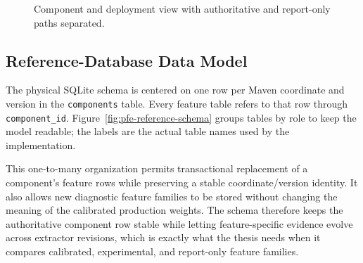 \begin{figure}[H]
{%
}
\caption{Component and deployment view with authoritative and report-only
paths separated.}
\label{fig:pfe-deployment}
\end{figure}

\subsection{Reference-Database Data Model}

The physical SQLite schema is centered on one row per Maven coordinate and
version in the \texttt{components} table. Every feature table refers to that
row through \texttt{component\_id}. Figure~\ref{fig:pfe-reference-schema}
groups tables by role to keep the model readable; the labels are the actual
table names used by the implementation.

This one-to-many organization permits transactional replacement of a
component's feature rows while preserving a stable coordinate/version
identity. It also allows new diagnostic feature families to be stored
without changing the meaning of the calibrated production weights. The
schema therefore keeps the authoritative component row stable while letting
feature-specific evidence evolve across extractor revisions, which is exactly
what the thesis needs when it compares calibrated, experimental, and
report-only feature families.

